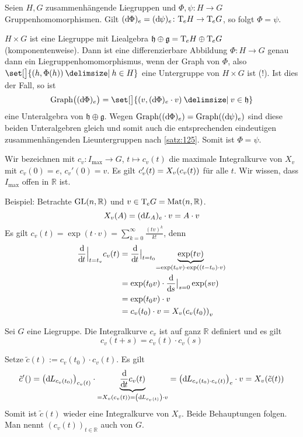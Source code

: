 \begin{korollar}[label=kor:126]
	Seien $H,G$ zusammenhängende Liegruppen und $\Phi, \psi \colon H \to G$ Gruppenhomomorphismen.
	Gilt $(\mathrm{d}\mkern-1.0mu \Phi)_e = (\mathrm{d}\mkern-1.0mu \psi)_e \colon \mathrm{T}\mkern-0.85mu_e H \to \mathrm{T}\mkern-0.85mu_e G$, so folgt $\Phi = \psi$.
\end{korollar}
\begin{beweis}
	$H \times G$ ist eine Liegruppe mit Liealgebra $\mathfrak{h} \oplus \mathfrak{g}= \mathrm{T}\mkern-0.85mu_e H \oplus \mathrm{T}\mkern-0.85mu_e G$ (komponentenweise).
	Dann ist eine differenzierbare Abbildung $\Phi \colon H \to G$ genau dann ein Liegruppenhomomorphismus, wenn der Graph von $\Phi$, also $\set[\big]{(h,\Phi(h)) \given h \in H}$ eine Untergruppe von $H \times G $ ist (!).
	Ist dies der Fall, so ist 
	\[
		\Graph \enbrace[\big]{(\mathd \Phi)_e} = \set[\big]{ \enbrace*{v, (\mathd \Phi)_e \cdot v} \given v \in \mathfrak{h}}
	\]
	eine Unteralgebra von $\mathfrak{h} \oplus \mathfrak{g}$.
	Wegen $\Graph \enbrace*{(\mathd \Phi)_e} = \Graph \enbrace*{(\mathd \psi)_e}$ sind diese beiden Unteralgebren gleich und somit auch die entsprechenden eindeutigen zusammenhängenden Lieuntergruppen nach \autoref{satz:125}.
	Somit ist $\Phi =\psi$.
\end{beweis}

Wir bezeichnen mit $c_v \colon I_{\max} \to G$, $t \mapsto c_v(t)$ die maximale Integralkurve von $X_v$ mit $c_v(0)=e$, $c_v'(0)=v$.
Es gilt $c_v'(t) = X_v \enbrace*{c_v(t)}$ für alle $t$.
Wir wissen, dass $I_{\max}$ offen in $\mathbb{R}$ ist.

Beispiel:
Betrachte $\operatorname{GL}(n,\mathbb{R})$ und $v \in \mathrm{T}\mkern-0.85mu_e G = \operatorname{Mat}(n,\mathbb{R})$.
\[
	X_v(A) = (\mathrm{d}\mkern-1.0mu L_A)_e \cdot v = A \cdot v
\]
Es gilt $c_v(t)= \exp(t \cdot v) = \sum_{k=0}^{\infty} \frac{(tv)^k}{k!}$, denn
\begin{align}
	\diffd{}{t}\Big|_{t=t_v} c_v(t) &= \diffd{}{t}\big|_{t=t_0} \Underbrace{\exp(t v)}{=\exp(t_0 v) \cdot \exp((t-t_0) \cdot v)} \\
	&= \exp(t_0 v) \cdot \diffd{}{s}\big|_{s=0} \exp(s v) \\
	&= \exp(t_0 v) \cdot v \\
	&= c_v(t_0) \cdot v = X_v \enbrace*{c_v(t_0)}_v
\end{align}

\begin{lemma}[label=lem:127]
	Sei $G$ eine Liegruppe.
	Die Integralkurve $c_v$ ist auf ganz $\mathbb{R}$ definiert und es gilt 
	\[
		c_v(t+s) = c_v(t) \cdot c_v(s)
	\]
\end{lemma}
\begin{beweis}
	Setze $\tilde{c}(t) := c_v(t_0) \cdot c_v(t)$.
	Es gilt 
	\begin{align}
		\tilde{c}'() = \enbrace*{\mathd L_{c_v(t_0)}}_{c_v(t)}  \cdot \Underbrace{\diffd{}{t} c_v(t)}{= X_v \enbrace*{c_v(t)} = \enbrace*{\mathd L_{c_v(t)}} \cdot v} = \enbrace*{\mathd L_{c_v(t_0) \cdot c_v(t)}}_e \cdot v = X_v \enbrace*{\tilde{c}(t)}
	\end{align}
	Somit ist $\tilde{c}(t)$ wieder eine Integralkurve von $X_v$.
	Beide Behauptungen folgen.
	Man nennt $(c_v(t))_{t \in \mathbb{R}}$ auch  von $G$. 
\end{beweis}

